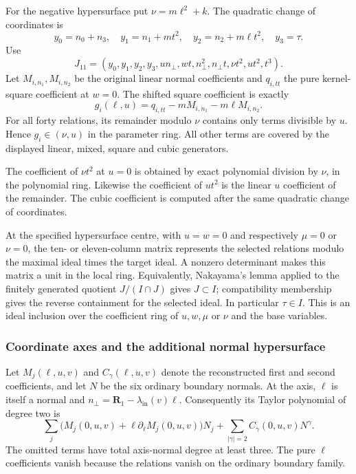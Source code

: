 \documentclass[11pt,a4paper]{article}
\numberwithin{equation}{section}
\theoremstyle{plain}
\theoremstyle{definition}
\theoremstyle{remark}
\begin{document}
For the negative hypersurface put $\nu=m\ell^2+k$. The quadratic change of coordinates is
\[
 y_0=n_0+n_3,\quad y_1=n_1+mt^2,\quad
 y_2=n_2+m\ell t^2,\quad y_3=\tau.
\]
Use
\begin{equation}\label{appr3ord:Jeleven}
 J_{11}=(y_0,y_1,y_2,y_3,un_\perp,wt,n_\perp^2,n_\perp t,
                   \nu t^2,ut^2,t^3).
\end{equation}
Let $M_{i,n_1},M_{i,n_2}$ be the original linear normal coefficients
and $q_{i,tt}$ the pure kernel-square coefficient at $w=0$.
The shifted square coefficient is exactly
\begin{equation}\label{appr3ord:shiftedsquare}
 g_i(\ell,u)=q_{i,tt}-mM_{i,n_1}-m\ell M_{i,n_2}.
\end{equation}
For all forty relations, its remainder modulo $\nu$ contains only
terms divisible by $u$. Hence $g_i\in(\nu,u)$ in the parameter
ring. All other terms
are covered by the displayed linear, mixed, square and cubic generators.

The coefficient of $\nu t^2$ at $u=0$ is obtained by exact polynomial
division by $\nu$, in the polynomial ring. Likewise the coefficient of $ut^2$ is the
linear $u$ coefficient of the remainder. The cubic coefficient is
computed after the same quadratic change of coordinates. 

At the specified hypersurface centre, with $u=w=0$ and respectively
$\mu=0$ or $\nu=0$, the ten- or eleven-column matrix
represents the selected relations modulo the maximal ideal
times the target ideal. A nonzero determinant makes this matrix a
unit in the local ring. Equivalently, Nakayama's lemma applied to the
finitely generated quotient $J/(I\cap J)$ gives $J\subset I$;
compatibility membership gives the reverse
containment for the selected ideal. In particular $\tau\in I$.
This is an ideal inclusion over the coefficient ring of $u,w,\mu$ or $\nu$
and the base variables.

\subsubsection{Coordinate axes and the additional normal hypersurface}

Let $M_j(\ell,u,v)$ and
$C_\gamma(\ell,u,v)$ denote the reconstructed first and second
coefficients, and let $N$ be the six ordinary boundary normals. At the axis,
$\ell$ is itself a normal and
$n_\perp=\boldsymbol R_1-\lambda_{\mathrm{in}}(v)\ell$. Consequently its Taylor polynomial of degree two is
\[
 \sum_j\bigl(M_j(0,u,v)+\ell\partial_\ell M_j(0,u,v)\bigr)N_j
 +\sum_{|\gamma|=2}C_\gamma(0,u,v)N^\gamma.
\]
The omitted terms have total axis-normal degree at least three.
The pure $\ell$ coefficients vanish because the relations vanish
on the ordinary boundary family.
\end{document}
